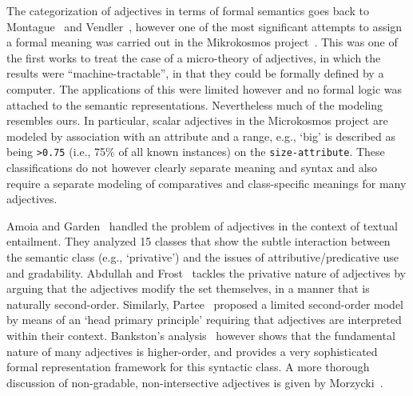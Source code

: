 \documentclass[11pt]{article}
\begin{document}
The categorization of adjectives in terms of formal semantics goes back to Montague~ and Vendler~, however one of the most significant attempts to assign a formal meaning was carried out in the Mikrokosmos project~\cite{raskin1995lexical}. This was one of the first works to treat the case of a micro-theory of adjectives, in which the results were ``machine-tractable'', in that they could be formally defined by a computer. The applications of this were limited however and no formal logic was attached to the semantic representations. Nevertheless much of the modeling resembles ours. In particular, scalar adjectives in the Microkosmos project are modeled by association with an attribute and a range, e.g., `big' is described as being {\tt >0.75} (i.e., 75\% of all known instances) on the {\tt size-attribute}. These classifications do not however clearly separate meaning and syntax and also require a separate modeling of comparatives and class-specific meanings for many adjectives.

Amoia and Garden~ handled the problem of adjectives in the context of textual entailment. They analyzed 15 classes that show the subtle interaction between the semantic class (e.g., `privative') and the issues of attributive/predicative use and gradability.  
Abdullah and Frost~ tackles the privative nature of adjectives by arguing that the adjectives modify the set themselves, in a manner that is naturally second-order. Similarly, Partee~ proposed a limited second-order model by means of an `head primary principle' requiring that adjectives are interpreted within their context. %
Bankston's analysis~ however shows that the fundamental nature of many adjectives is higher-order, and provides a very sophisticated formal representation framework for this syntactic class.
A more thorough discussion of non-gradable, non-intersective adjectives is given by Morzycki~.
\end{document}
